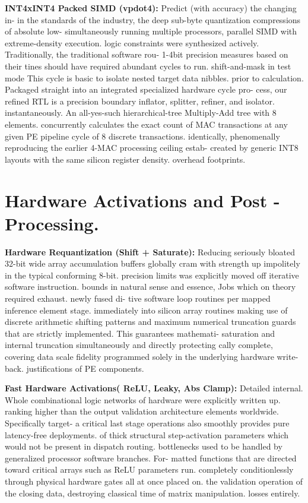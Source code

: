 \textbf{INT4xINT4 Packed SIMD (vpdot4):} Predict (with accuracy) the changing in- in the standards of the industry, the deep sub-byte quantization compressions of absolute low- simultaneously running multiple processors, parallel SIMD with extreme-density execution. logic constraints were synthesized actively. Traditionally, the traditional software rou- 1-4bit precision measures based on their tines should have required abundant cycles to run. shift-and-mask in test mode This cycle is basic to isolate nested target data nibbles. prior to calculation. Packaged straight into an integrated specialized hardware cycle pro- cess, our refined RTL is a precision boundary inflator, splitter, refiner, and isolator. instantaneously. An all-yes-such hierarchical-tree Multiply-Add tree with 8 elements. concurrently calculates the exact count of MAC transactions at any given PE pipeline cycle of 8 discrete transactions. identically, phenomenally reproducing the earlier 4-MAC processing ceiling estab- created by generic INT8 layouts with the same silicon register density. overhead footprints.

\section{Hardware Activations and Post -Processing.}
\textbf{Hardware Requantization (Shift + Saturate):} Reducing seriously bloated 32-bit wide array accumulation buffers globally cram with strength up impolitely in the typical conforming 8-bit. precision limits was explicitly moved off iterative software instruction. bounds in natural sense and essence, Jobs which on theory required exhaust. newly fused di- tive software loop routines per mapped inference element stage. immediately into silicon array routines making use of discrete arithmetic shifting patterns and maximum numerical truncation guards that are strictly implemented. This guarantees mathemati- saturation and internal truncation simultaneously and directly protecting cally complete, covering data scale fidelity programmed solely in the underlying hardware write-back. justifications of PE components.

\textbf{Fast Hardware Activations( ReLU, Leaky, Abs Clamp):} Detailed internal. Whole combinational logic networks of hardware were explicitly written up. ranking higher than the output validation architecture elements worldwide. Specifically target- a critical last stage operations also smoothly provides pure latency-free deployments. of thick structural step-activation parameters which would not be present in dispatch routing. bottlenecks used to be handled by generalized processor software branches. For- matted functions that are directed toward critical arrays such as ReLU parameters run. completely conditionlessly through physical hardware gates all at once placed on. the validation operation of the closing data, destroying classical time of matrix manipulation. losses entirely.

